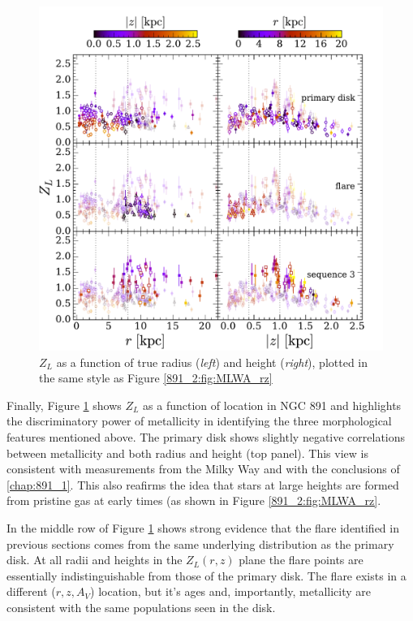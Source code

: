 \begin{figure}
  \centering
  \includegraphics[width=\textwidth]{891_2/figs/MLWZ_rz_all.pdf}
  \caption[$Z_L$ vs
    ($r,|z|$)]{\fixspacing\label{891_2:fig:MLWZ_rz}$Z_L$ as a function
    of true radius (\emph{left}) and height (\emph{right}), plotted in
    the same style as Figure \ref{891_2:fig:MLWA_rz}}
\end{figure}

Finally, Figure \ref{891_2:fig:MLWZ_rz} shows $Z_L$ as a function of
location in NGC 891 and highlights the discriminatory power of
metallicity in identifying the three morphological features mentioned
above. The primary disk shows slightly negative correlations
between metallicity and both radius and height (top panel). This view
is consistent with measurements from the Milky Way \citep{Bovy12,
  Hayden14} and with the conclusions of
\ref{chap:891_1}. This also reafirms the idea that stars at
large heights are formed from pristine gas at early times (as shown in
Figure \ref{891_2:fig:MLWA_rz}.

In the middle row of Figure \ref{891_2:fig:MLWZ_rz} shows strong evidence
that the flare identified in previous sections comes from the same
underlying distribution as the primary disk. At all radii and heights
in the $Z_L(r,z)$ plane the flare points are essentially
indistinguishable from those of the primary disk. The flare exists in
a different ($r,z,A_V$) location, but it's ages and, importantly,
metallicity are consistent with the same populations seen in the disk.

